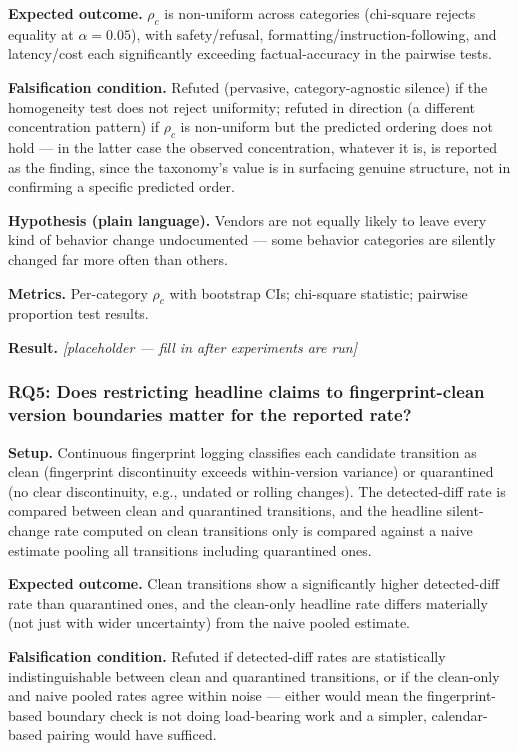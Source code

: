 \documentclass[11pt]{article}
\newcommand{\ph}{\textit{[placeholder --- fill in after experiments are run]}}
\begin{document}
\textbf{Expected outcome.} $\rho_c$ is non-uniform across categories (chi-square rejects equality at $\alpha=0.05$), with safety/refusal, formatting/instruction-following, and latency/cost each significantly exceeding factual-accuracy in the pairwise tests.

\textbf{Falsification condition.} Refuted (pervasive, category-agnostic silence) if the homogeneity test does not reject uniformity; refuted in direction (a different concentration pattern) if $\rho_c$ is non-uniform but the predicted ordering does not hold --- in the latter case the observed concentration, whatever it is, is reported as the finding, since the taxonomy's value is in surfacing genuine structure, not in confirming a specific predicted order.

\textbf{Hypothesis (plain language).} Vendors are not equally likely to leave every kind of behavior change undocumented --- some behavior categories are silently changed far more often than others.

\textbf{Metrics.} Per-category $\rho_c$ with bootstrap CIs; chi-square statistic; pairwise proportion test results.

\textbf{Result.} \ph

\subsubsection{RQ5: Does restricting headline claims to fingerprint-clean version boundaries matter for the reported rate?}
\textbf{Setup.} Continuous fingerprint logging classifies each candidate transition as clean (fingerprint discontinuity exceeds within-version variance) or quarantined (no clear discontinuity, e.g., undated or rolling changes). The detected-diff rate is compared between clean and quarantined transitions, and the headline silent-change rate computed on clean transitions only is compared against a naive estimate pooling all transitions including quarantined ones.

\textbf{Expected outcome.} Clean transitions show a significantly higher detected-diff rate than quarantined ones, and the clean-only headline rate differs materially (not just with wider uncertainty) from the naive pooled estimate.

\textbf{Falsification condition.} Refuted if detected-diff rates are statistically indistinguishable between clean and quarantined transitions, or if the clean-only and naive pooled rates agree within noise --- either would mean the fingerprint-based boundary check is not doing load-bearing work and a simpler, calendar-based pairing would have sufficed.
\end{document}
